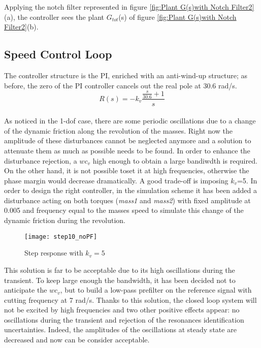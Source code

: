 Applying the notch filter represented in figure \ref{fig:Plant G(s)with Notch Filter2}(a), the controller sees the plant $G_{tot}$(s) of figure \ref{fig:Plant G(s)with Notch Filter2}(b).

\newpage 
\subsection{Speed Control Loop}
The controller structure is the PI, enriched with an anti-wind-up structure; as before, the zero of the PI controller cancels out the real pole at 30.6 rad/s.
\\
\[
R(s)=-k_v
\frac{\frac{s}{30.6}+1}{s}
\]
\\

As noticed in the 1-dof case, there are some periodic oscillations due to a change of the dynamic friction along the revolution of the masses. Right now the amplitude of these disturbances cannot be neglected anymore and a solution to attenuate them as much as possible needs to be found. In order to enhance the disturbance rejection, a $wc_v$ high enough to obtain a large bandiwdth is required. On the other hand, it is not possible toset it at high frequencies, otherwise the phase margin would decrease dramatically. A good trade-off is imposing $k_v$=5.
 In order to design the right controller, in the simulation scheme it has been added a disturbance acting on both torques (\textit{mass1} and \textit{mass2}) with fixed amplitude at 0.005 and frequency equal to the masses speed to simulate this change of the dynamic friction during the revolution.
\begin{figure*}[h]
	\centering
	\texttt{[image: step10\_noPF]}
	\caption{Step response with $k_v=5 $}
	\label{fig:step10_noPF}
\end{figure*}
\newline
This solution is far to be acceptable due to its high oscillations during the transient. To keep large enough the bandwidth, it has been decided not to anticipate the $wc_v$, but to build a low-pass prefilter on the reference signal with cutting frequency at 7 rad/s. Thanks to this solution, the closed loop system will not be excited by high frequencies and two other positive effects appear: no oscillations during the transient and rejection of the resonances identification uncertainties. Indeed, the amplitudes of the oscillations at steady state are decreased and now can be consider acceptable. 

